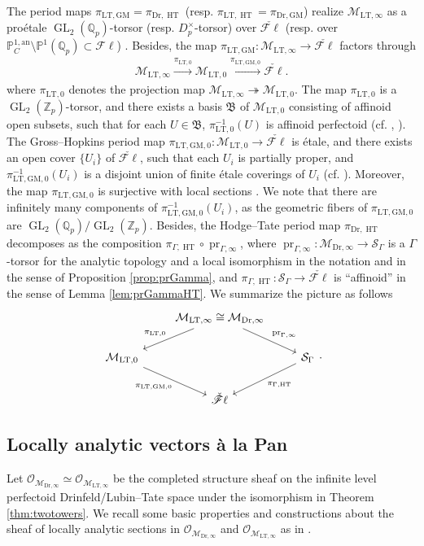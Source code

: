 \documentclass{article}
\theoremstyle{definition}
\def\calM{\mathcal{M}}
\def\calO{\mathcal{O}}
\def\calS{\mathcal{S}}
\def\ffrb{\mathfrak{B}}
\def\bbP{\mathbb{P}}
\def\bbQ{\mathbb{Q}}
\def\bbZ{\mathbb{Z}}
\def\comp{\circ}
\def\surj{\twoheadrightarrow}
\def\isom{\cong}
\DeclareMathOperator{\pr}{pr}
\DeclareMathOperator{\GL}{GL}
\DeclareMathOperator{\HT}{HT}
\def\LT{\mathrm{LT}}
\def\an{\mathrm{an}}
\def\fl{\mathscr{F}\ell}
\def\GM{\mathrm{GM}}
\def\Dr{\mathrm{Dr}}
\def\ov{\stackrel}
\begin{document}
The period maps $\pi_{\LT,\GM}=\pi_{\Dr,\HT}$ (resp. $\pi_{\LT,\HT}=\pi_{\Dr,\GM}$) realize $\calM_{\LT,\infty}$ as a pro\'etale $\GL_2(\bbQ_p)$-torsor (resp. $D_p^{\times}$-torsor) over $\check{\fl}$ (resp. over $\bbP^{1,\an}_C\setminus\bbP^1(\bbQ_p)\subset \fl$) \cite[Corollary 23.5.3]{scholze2020berkeley}. Besides, the map $\pi_{\LT,\GM}:\calM_{\LT,\infty}\to \check{\fl}$ factors through 
\begin{align*}
    \calM_{\LT,\infty}\ov{\pi_{\LT,0}}\to\calM_{\LT,0}\ov{\pi_{\LT,\GM,0}}\to  \check{\fl}.
\end{align*}
where $\pi_{\LT,0}$ denotes the projection map $\calM_{\LT,\infty}\surj \calM_{\LT,0}$. The map $\pi_{\LT,0}$ is a $\GL_2(\bbZ_p)$-torsor, and there exists a basis $\ffrb$ of $\calM_{\LT,0}$ consisting of affinoid open subsets, such that for each $U\in\ffrb$, $\pi^{-1}_{\LT,0}(U)$ is affinoid perfectoid (cf. \cite{Wei16}, \cite[Proposition 4.2(i)]{CDN20}). The Gross--Hopkins period map $\pi_{\LT,\GM,0}:\calM_{\LT,0}\to \check{\fl}$ is \'etale, and there exists an open cover $\{U_i\}$ of $\check{\fl}$, such that each $U_i$ is partially proper, and $\pi_{\LT,\GM,0}^{-1}(U_i)$ is a disjoint union of finite \'etale coverings of $U_i$ (cf. \cite[Proposition 7.2]{deJong}). Moreover, the map $\pi_{\LT,\GM,0}$ is surjective with local sections \cite[Lemma 6.1.4]{SW13}. We note that there are infinitely many components of $\pi_{\LT,\GM,0}^{-1}(U_i)$, as the geometric fibers of $\pi_{\LT,\GM,0}$ are $\GL_2(\bbQ_p)/\GL_2(\bbZ_p)$. Besides, the Hodge--Tate period map $\pi_{\Dr,\HT}$ decomposes as the composition $\pi_{\Gamma,\HT}\comp \pr_{\Gamma,\infty}$, where $\pr_{\Gamma,\infty}:\calM_{\Dr,\infty}\to \calS_{\Gamma}$ is a $\Gamma$-torsor for the analytic topology and a local isomorphism in the notation and in the sense of Proposition \ref{prop:prGamma}, and $\pi_{\Gamma,\HT}:\calS_{\Gamma}\to \check{\fl}$ is ``affinoid'' in the sense of Lemma \ref{lem:prGammaHT}. We summarize the picture as follows
$$
\begin{tikzcd}
& {\calM_{\LT,\infty}\isom \calM_{\Dr,\infty}} \arrow[ld, "\pi_{\LT,0}"'] \arrow[rd, "\pr_{\Gamma,\infty}"] &        \\
{\calM_{\LT,0}} \arrow[rd, "{\pi_{\LT,\GM,0}}"'] &  & { \calS_{\Gamma}} \arrow[ld, "{\pi_{\Gamma,\HT}}"] \\& \check{\fl} &                                                             
\end{tikzcd}.
$$
\subsection{Locally analytic vectors à la Pan}\label{subsec:locallyanalyticvectors}
Let $\calO_{\calM_{\Dr,\infty}}\simeq \calO_{\calM_{\LT,\infty}}$ be the completed structure sheaf on the infinite level perfectoid Drinfeld/Lubin--Tate space under the isomorphism in Theorem \ref{thm:twotowers}. We recall some basic properties and constructions about the sheaf of locally analytic sections in $\calO_{\calM_{\Dr,\infty}}$ and $\calO_{\calM_{\LT,\infty}}$ as in \cite{Pan22,PanII}.
\end{document}
